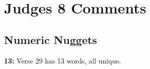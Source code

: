 \section{Judges 8 Comments}

\subsection{Numeric Nuggets}
\textbf{13: } Verse 29 has 13 words, all unique.
